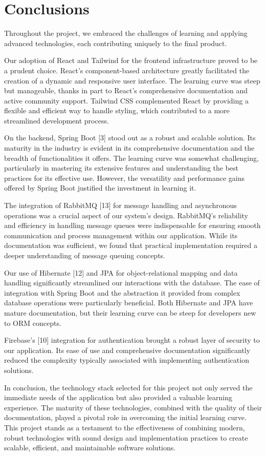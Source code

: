 \section{Conclusions}
\label{sec:conclusion}

Throughout the project, we embraced the challenges of learning and applying advanced technologies, each contributing uniquely to the final product.

Our adoption of React and Tailwind for the frontend infrastructure proved to be a prudent choice. React's component-based architecture greatly facilitated the creation of a dynamic and responsive user interface. The learning curve was steep but manageable, thanks in part to React's comprehensive documentation and active community support. Tailwind CSS complemented React by providing a flexible and efficient way to handle styling, which contributed to a more streamlined development process.

On the backend, Spring Boot [3] stood out as a robust and scalable solution. Its maturity in the industry is evident in its comprehensive documentation and the breadth of functionalities it offers. The learning curve was somewhat challenging, particularly in mastering its extensive features and understanding the best practices for its effective use. However, the versatility and performance gains offered by Spring Boot justified the investment in learning it.

The integration of RabbitMQ [13] for message handling and asynchronous operations was a crucial aspect of our system's design. RabbitMQ's reliability and efficiency in handling message queues were indispensable for ensuring smooth communication and process management within our application. While its documentation was sufficient, we found that practical implementation required a deeper understanding of message queuing concepts.

Our use of Hibernate [12] and JPA for object-relational mapping and data handling significantly streamlined our interactions with the database. The ease of integration with Spring Boot and the abstraction it provided from complex database operations were particularly beneficial. Both Hibernate and JPA have mature documentation, but their learning curve can be steep for developers new to ORM concepts.

Firebase's [10] integration for authentication brought a robust layer of security to our application. Its ease of use and comprehensive documentation significantly reduced the complexity typically associated with implementing authentication solutions.

In conclusion, the technology stack selected for this project not only served the immediate needs of the application but also provided a valuable learning experience. The maturity of these technologies, combined with the quality of their documentation, played a pivotal role in overcoming the initial learning curve. This project stands as a testament to the effectiveness of combining modern, robust technologies with sound design and implementation practices to create scalable, efficient, and maintainable software solutions.






